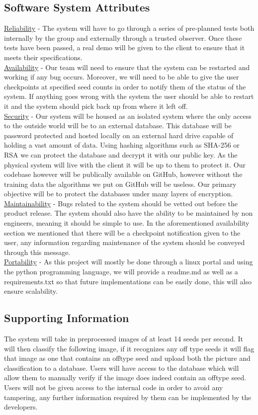 \documentclass[onecolumn, draftclsnofoot,10pt, compsoc]{IEEEtran}
\begin{document}
\subsection{Software System Attributes}
\underline{Reliability} - The system will have to go through a series of pre-planned tests both internally by the group and externally through a trusted observer. Once these tests have been passed, a real demo will be given to the client to ensure that it meets their specifications.\\ 
\underline{Availability} - Our team will need to ensure that the system can be restarted and working if any bug occurs. Moreover, we will need to be able to give the user checkpoints at specified seed counts in order to notify them of the status of the system. If anything goes wrong with the system the user should be able to restart it and the system should pick back up from where it left off.\\ 
\underline{Security} - Our system will be housed as an isolated system where the only access to the outside world will be to an external database. This database will be password protected and hosted locally on an external hard drive capable of holding a vast amount of data. Using hashing algorithms such as SHA-256 or RSA we can protect the database and decrypt it with our public key. As the physical system will live with the client it will be up to them to protect it. Our codebase however will be publically available on GitHub, however without the training data the algorithms we put on GitHub will be useless. Our primary objective will be to protect the databases under many layers of encryption.\\
\underline{Maintainability} - Bugs related to the system should be vetted out before the product release. The system should also have the ability to be maintained by non engineers, meaning it should be simple to use. In the aforementioned availability section we mentioned that there will be a checkpoint notification given to the user, any information regarding maintenance of the system should be conveyed through this message. \\
\underline{Portability} - As this project will mostly be done through a linux portal and using the python programming language, we will provide a readme.md as well as a requirements.txt so that future implementations can be easily done, this will also ensure scalability. 


\subsection{Supporting Information}
The system will take in preprocessed images of at least 14 seeds per second. It will then classify the following image, if it recognizes any off type seeds it will flag that image as one that contains an offtype seed and upload both the picture and classification to a database. Users will have access to the database which will allow them to manually verify if the image does indeed contain an offtype seed. Users will not be given access to the internal code in order to avoid any tampering, any further information required by them can be implemented by the developers. 
\end{document}
